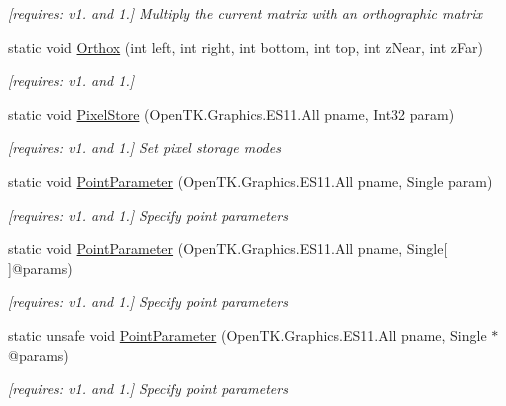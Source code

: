 \begin{DoxyCompactItemize}
\begin{DoxyCompactList}\small\item\em \mbox{[}requires\-: v1. and 1.\mbox{]} Multiply the current matrix with an orthographic matrix \end{DoxyCompactList}\item 
static void \hyperlink{class_open_t_k_1_1_graphics_1_1_e_s11_1_1_g_l_afeaa455bffcb881487f64a8d3d336f7d}{Orthox} (int left, int right, int bottom, int top, int z\-Near, int z\-Far)
\begin{DoxyCompactList}\small\item\em \mbox{[}requires\-: v1. and 1.\mbox{]}\end{DoxyCompactList}\item 
static void \hyperlink{class_open_t_k_1_1_graphics_1_1_e_s11_1_1_g_l_a6f31a32cf4269e4a125581e53e9cceee}{Pixel\-Store} (Open\-T\-K.\-Graphics.\-E\-S11.\-All pname, Int32 param)
\begin{DoxyCompactList}\small\item\em \mbox{[}requires\-: v1. and 1.\mbox{]} Set pixel storage modes \end{DoxyCompactList}\item 
static void \hyperlink{class_open_t_k_1_1_graphics_1_1_e_s11_1_1_g_l_a277886b760fa7fe13238738105fef4bc}{Point\-Parameter} (Open\-T\-K.\-Graphics.\-E\-S11.\-All pname, Single param)
\begin{DoxyCompactList}\small\item\em \mbox{[}requires\-: v1. and 1.\mbox{]} Specify point parameters \end{DoxyCompactList}\item 
static void \hyperlink{class_open_t_k_1_1_graphics_1_1_e_s11_1_1_g_l_a9b58a142d283cfff938b7c725de15c59}{Point\-Parameter} (Open\-T\-K.\-Graphics.\-E\-S11.\-All pname, Single\mbox{[}$\,$\mbox{]}@params)
\begin{DoxyCompactList}\small\item\em \mbox{[}requires\-: v1. and 1.\mbox{]} Specify point parameters \end{DoxyCompactList}\item 
static unsafe void \hyperlink{class_open_t_k_1_1_graphics_1_1_e_s11_1_1_g_l_aa37e44a0f78c53457a3a43a671acae0e}{Point\-Parameter} (Open\-T\-K.\-Graphics.\-E\-S11.\-All pname, Single $\ast$@params)
\begin{DoxyCompactList}\small\item\em \mbox{[}requires\-: v1. and 1.\mbox{]} Specify point parameters \end{DoxyCompactList}\item 

\end{DoxyCompactItemize}
